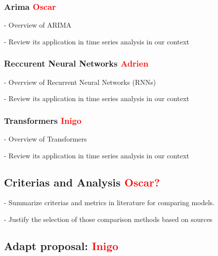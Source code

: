 \documentclass[12pt, letterpaper]{article}
\begin{document}
    \subsubsection*{Arima \textcolor{red}{Oscar}}
    - Overview of ARIMA 

    - Review its application in time series analysis in our context
    \subsubsection*{Reccurent Neural Networks \textcolor{red}{Adrien}}
    - Overview of Recurrent Neural Networks (RNNs)

    - Review its application in time series analysis in our context
    \subsubsection*{Transformers \textcolor{red}{Inigo}}
    - Overview of Transformers

    - Review its application in time series analysis in our context


\subsection*{Criterias and Analysis \textcolor{red}{Oscar?}}
- Summarize criterias and metrics in literature for comparing models.

- Justify the selection of those comparison methods based on sources



\subsection*{Adapt proposal: \textcolor{red}{Inigo}}
\end{document}

